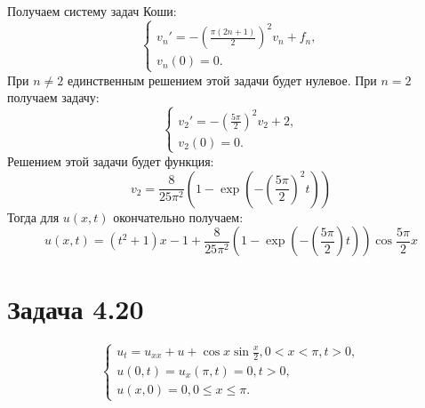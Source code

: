\documentclass[11pt]{article}
\begin{document}
Получаем систему задач Коши:
\begin{equation}
\begin{cases}
v_n' = -\left(\frac{\pi(2n + 1)}2\right)^2v_n + f_n, \\
v_n(0) = 0.
\end{cases}
\end{equation}
При $n \neq 2$ единственным решением этой задачи будет нулевое. При $n = 2$ получаем задачу:
\begin{equation*}
\begin{cases}
v_2' = -\left(\frac{5\pi}2\right)^2v_2 + 2, \\
v_2(0) = 0.
\end{cases}
\end{equation*}
Решением этой задачи будет функция:
\begin{equation*}
v_2 = \frac{8}{25\pi^2}\left(1 - \exp\left(-\left(\frac{5\pi}2\right)^2t\right)\right)
\end{equation*}
Тогда для $u(x, t)$ окончательно получаем:
\begin{equation}
u(x, t) = (t^2 + 1)x - 1 + \frac8{25\pi^2}\left(1 - \exp\left(-\left(\frac{5\pi}2\right)t\right)\right)\cos\frac{5\pi}2x
\end{equation}
\section{Задача 4.20}
\label{sec:orgac78a09}
\begin{equation}
\begin{cases}
u_t = u_{xx} + u + \cos x\sin\frac{x}2, 0 < x < \pi, t > 0, \\
u(0, t) = u_x(\pi, t) = 0, t > 0, \\
u(x, 0) = 0, 0 \leq x \leq \pi.
\end{cases}
\end{equation}
\end{document}
